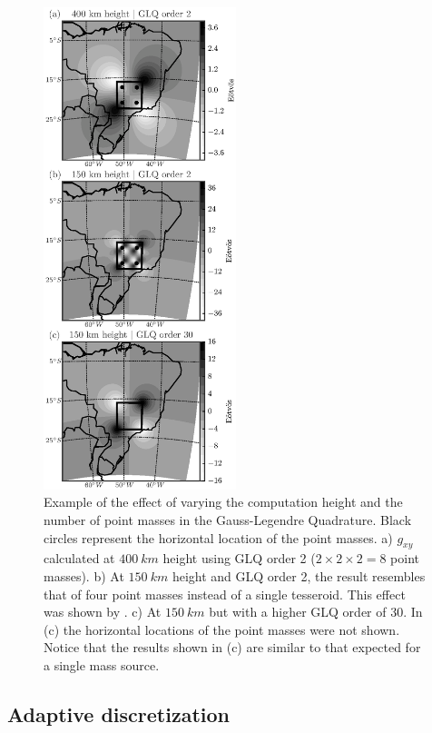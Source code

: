 \begin{figure}
    \centering
    \includegraphics[width=0.5\textwidth]{figures/paper-tesseroids/vary-height-and-order}
    \caption{
        Example of the effect of varying
        the computation height
        and the number of point masses in the Gauss-Legendre Quadrature.
        Black circles represent the horizontal location of the point masses.
        a) $g_{xy}$ calculated at $400\ km$ height using GLQ order 2
        ($2 \times 2 \times 2 = 8$ point masses).
        b) At $150\ km$ height and GLQ order 2,
        the result resembles that of
        four point masses instead of a single tesseroid.
        This effect was shown by \citet{ku1977}.
        c) At $150\ km$ but with a higher GLQ order of 30.
        In (c) the horizontal locations of the point masses were not shown.
        Notice that the results shown in (c) are similar to that expected
        for a single mass source.
    }
    \label{fig:p2-glqerrorsample}
\end{figure}


\subsection{Adaptive discretization}

